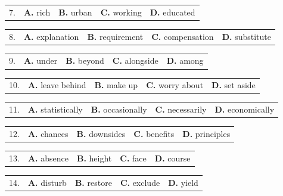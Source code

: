 \documentclass[UTF8,11pt]{ctexart}
\begin{document}
\noindent\begin{tabularx}{\linewidth}{@{}lXXXX@{}}7. & \textbf{A.} rich & \textbf{B.} urban & \textbf{C.} working & \textbf{D.} educated\\\end{tabularx}\par

\noindent\begin{tabularx}{\linewidth}{@{}lXXXX@{}}8. & \textbf{A.} explanation & \textbf{B.} requirement & \textbf{C.} compensation & \textbf{D.} substitute\\\end{tabularx}\par

\noindent\begin{tabularx}{\linewidth}{@{}lXXXX@{}}9. & \textbf{A.} under & \textbf{B.} beyond & \textbf{C.} alongside & \textbf{D.} among\\\end{tabularx}\par

\noindent\begin{tabularx}{\linewidth}{@{}lXXXX@{}}10. & \textbf{A.} leave behind & \textbf{B.} make up & \textbf{C.} worry about & \textbf{D.} set aside\\\end{tabularx}\par

\noindent\begin{tabularx}{\linewidth}{@{}lXXXX@{}}11. & \textbf{A.} statistically & \textbf{B.} occasionally & \textbf{C.} necessarily & \textbf{D.} economically\\\end{tabularx}\par

\noindent\begin{tabularx}{\linewidth}{@{}lXXXX@{}}12. & \textbf{A.} chances & \textbf{B.} downsides & \textbf{C.} benefits & \textbf{D.} principles\\\end{tabularx}\par

\noindent\begin{tabularx}{\linewidth}{@{}lXXXX@{}}13. & \textbf{A.} absence & \textbf{B.} height & \textbf{C.} face & \textbf{D.} course\\\end{tabularx}\par

\noindent\begin{tabularx}{\linewidth}{@{}lXXXX@{}}14. & \textbf{A.} disturb & \textbf{B.} restore & \textbf{C.} exclude & \textbf{D.} yield\\\end{tabularx}\par
\end{document}
